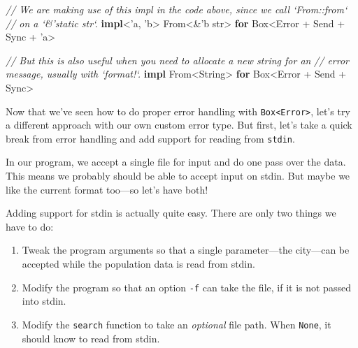 \documentclass[a4paper,]{book}
\newenvironment{Shaded}{\begin{snugshade}}{\end{snugshade}}
\newcommand{\KeywordTok}[1]{\textcolor[rgb]{0.13,0.29,0.53}{\textbf{{#1}}}}
\newcommand{\DataTypeTok}[1]{\textcolor[rgb]{0.13,0.29,0.53}{{#1}}}
\newcommand{\CommentTok}[1]{\textcolor[rgb]{0.56,0.35,0.01}{\textit{{#1}}}}
\newcommand{\OtherTok}[1]{\textcolor[rgb]{0.56,0.35,0.01}{{#1}}}
\newcommand{\BuiltInTok}[1]{{#1}}
\newcommand{\NormalTok}[1]{{#1}}
\providecommand{\tightlist}{%
  \setlength{\itemsep}{0pt}\setlength{\parskip}{0pt}}
\begin{document}
\begin{Shaded}
\begin{Highlighting}[]
\CommentTok{// We are making use of this impl in the code above, since we call `From::from`}
\CommentTok{// on a `&'static str`.}
\KeywordTok{impl}\NormalTok{<}\OtherTok{'a}\NormalTok{, }\OtherTok{'b}\NormalTok{> From<&}\OtherTok{'b} \DataTypeTok{str}\NormalTok{> }\KeywordTok{for} \DataTypeTok{Box}\NormalTok{<Error + }\BuiltInTok{Send} \NormalTok{+ }\BuiltInTok{Sync} \NormalTok{+ }\OtherTok{'a}\NormalTok{>}

\CommentTok{// But this is also useful when you need to allocate a new string for an}
\CommentTok{// error message, usually with `format!`.}
\KeywordTok{impl} \NormalTok{From<}\DataTypeTok{String}\NormalTok{> }\KeywordTok{for} \DataTypeTok{Box}\NormalTok{<Error + }\BuiltInTok{Send} \NormalTok{+ }\BuiltInTok{Sync}\NormalTok{>}
\end{Highlighting}
\end{Shaded}

Now that we've seen how to do proper error handling with
\texttt{Box\textless{}Error\textgreater{}}, let's try a different
approach with our own custom error type. But first, let's take a quick
break from error handling and add support for reading from
\texttt{stdin}.


In our program, we accept a single file for input and do one pass over
the data. This means we probably should be able to accept input on
stdin. But maybe we like the current format too---so let's have both!

Adding support for stdin is actually quite easy. There are only two
things we have to do:

\begin{enumerate}
\def\labelenumi{\arabic{enumi}.}
\tightlist
\item
  Tweak the program arguments so that a single parameter---the
  city---can be accepted while the population data is read from stdin.
\item
  Modify the program so that an option \texttt{-f} can take the file, if
  it is not passed into stdin.
\item
  Modify the \texttt{search} function to take an \emph{optional} file
  path. When \texttt{None}, it should know to read from stdin.
\end{enumerate}
\end{document}
